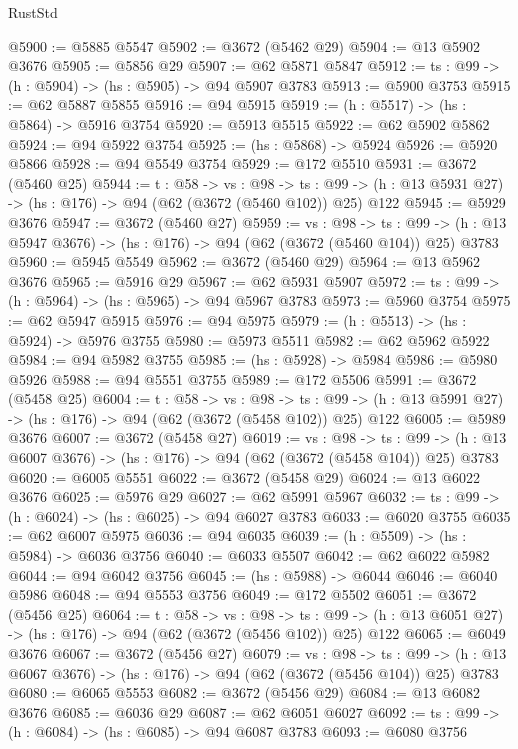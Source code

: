 \begin{lexlean}{RustStd}
\begin{coremodule}
{\begin{coremodule}
{{{{{{{{{@5900 := @5885 @5547
@5902 := @3672 (@5462 @29)
@5904 := @13 @5902 @3676
@5905 := @5856 @29
@5907 := @62 @5871 @5847
@5912 := {ts : @99} -> (h : @5904) -> (hs : @5905) -> @94 @5907 @3783
@5913 := @5900 @3753
@5915 := @62 @5887 @5855
@5916 := @94 @5915
@5919 := (h : @5517) -> (hs : @5864) -> @5916 @3754
@5920 := @5913 @5515
@5922 := @62 @5902 @5862
@5924 := @94 @5922 @3754
@5925 := (hs : @5868) -> @5924
@5926 := @5920 @5866
@5928 := @94 @5549 @3754
@5929 := @172 @5510
@5931 := @3672 (@5460 @25)
@5944 := {t : @58} ->
  {vs : @98} ->
  {ts : @99} -> (h : @13 @5931 @27) -> (hs : @176) -> @94 (@62 (@3672 (@5460 @102)) @25) @122
@5945 := @5929 @3676
@5947 := @3672 (@5460 @27)
@5959 := {vs : @98} ->
  {ts : @99} -> (h : @13 @5947 @3676) -> (hs : @176) -> @94 (@62 (@3672 (@5460 @104)) @25) @3783
@5960 := @5945 @5549
@5962 := @3672 (@5460 @29)
@5964 := @13 @5962 @3676
@5965 := @5916 @29
@5967 := @62 @5931 @5907
@5972 := {ts : @99} -> (h : @5964) -> (hs : @5965) -> @94 @5967 @3783
@5973 := @5960 @3754
@5975 := @62 @5947 @5915
@5976 := @94 @5975
@5979 := (h : @5513) -> (hs : @5924) -> @5976 @3755
@5980 := @5973 @5511
@5982 := @62 @5962 @5922
@5984 := @94 @5982 @3755
@5985 := (hs : @5928) -> @5984
@5986 := @5980 @5926
@5988 := @94 @5551 @3755
@5989 := @172 @5506
@5991 := @3672 (@5458 @25)
@6004 := {t : @58} ->
  {vs : @98} ->
  {ts : @99} -> (h : @13 @5991 @27) -> (hs : @176) -> @94 (@62 (@3672 (@5458 @102)) @25) @122
@6005 := @5989 @3676
@6007 := @3672 (@5458 @27)
@6019 := {vs : @98} ->
  {ts : @99} -> (h : @13 @6007 @3676) -> (hs : @176) -> @94 (@62 (@3672 (@5458 @104)) @25) @3783
@6020 := @6005 @5551
@6022 := @3672 (@5458 @29)
@6024 := @13 @6022 @3676
@6025 := @5976 @29
@6027 := @62 @5991 @5967
@6032 := {ts : @99} -> (h : @6024) -> (hs : @6025) -> @94 @6027 @3783
@6033 := @6020 @3755
@6035 := @62 @6007 @5975
@6036 := @94 @6035
@6039 := (h : @5509) -> (hs : @5984) -> @6036 @3756
@6040 := @6033 @5507
@6042 := @62 @6022 @5982
@6044 := @94 @6042 @3756
@6045 := (hs : @5988) -> @6044
@6046 := @6040 @5986
@6048 := @94 @5553 @3756
@6049 := @172 @5502
@6051 := @3672 (@5456 @25)
@6064 := {t : @58} ->
  {vs : @98} ->
  {ts : @99} -> (h : @13 @6051 @27) -> (hs : @176) -> @94 (@62 (@3672 (@5456 @102)) @25) @122
@6065 := @6049 @3676
@6067 := @3672 (@5456 @27)
@6079 := {vs : @98} ->
  {ts : @99} -> (h : @13 @6067 @3676) -> (hs : @176) -> @94 (@62 (@3672 (@5456 @104)) @25) @3783
@6080 := @6065 @5553
@6082 := @3672 (@5456 @29)
@6084 := @13 @6082 @3676
@6085 := @6036 @29
@6087 := @62 @6051 @6027
@6092 := {ts : @99} -> (h : @6084) -> (hs : @6085) -> @94 @6087 @3783
@6093 := @6080 @3756
}}}}}}}}}
\end{coremodule}}
\end{coremodule}
\end{lexlean}
